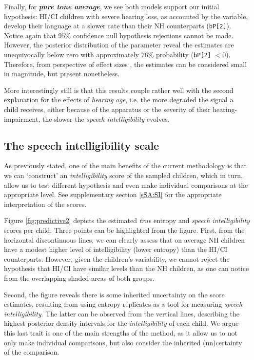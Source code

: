 Finally, for \textbf{\textit{pure tone average}}, we see both models support our initial hypothesis: HI/CI children with severe hearing loss, as accounted by the variable, develop their language at a slower rate than their NH counterparts (\texttt{bP[2]}). Notice again that $95\%$ confidence null hypothesis rejections cannot be made. However, the posterior distribution of the parameter reveal the estimates are unequivocally below zero with approximately $76\%$ probability (\texttt{bP[2]} $< 0$). Therefore, from perspective of effect sizes \cite{Cohen_1988, Sawilowsky_2009}, the estimates can be considered small in magnitude, but present nonetheless.

More interestingly still is that this results couple rather well with the second explanation for the effects of \textit{hearing age}, i.e. the more degraded the signal a child receives, either because of the apparatus or the severity of their hearing-impairment, the slower the \textit{speech intelligibility} evolves. 
%
%
\subsection{The speech intelligibility scale} \label{sS:results_scales}
%
As previously stated, one of the main benefits of the current methodology is that we can `construct' an \textit{intelligibility} score of the sampled children, which in turn, allow us to test different hypothesis and even make individual comparisons at the appropriate level. See supplementary section \ref{sSA:SI} for the appropriate interpretation of the scores.

Figure \ref{fig:predictive2} depicts the estimated \textit{true} entropy and \textit{speech intelligibility} scores per child. Three points can be highlighted from the figure. First, from the horizontal discontinuous lines, we can clearly assess that on average NH children have a modest higher level of intelligibility (lower entropy) than the HI/CI counterparts. However, given the children's variability, we cannot reject the hypothesis that HI/CI have similar levels than the NH children, as one can notice from the overlapping shaded areas of both groups. 

Second, the figure reveals there is some inherited uncertainty on the score estimates, resulting from using entropy replicates as a tool for measuring \textit{speech intelligibility}. The latter can be observed from the vertical lines, describing the highest posterior density intervals for the \textit{intelligibility} of each child. We argue this last trait is one of the main strengths of the method, as it allow us to not only make individual comparisons, but also consider the inherited (un)certainty of the comparison.

